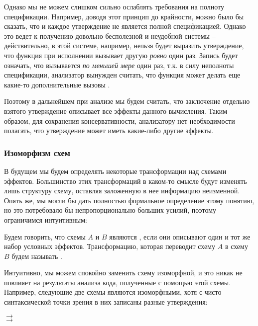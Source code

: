 Однако мы не можем слишком сильно ослаблять требования на полноту спецификации. Например, доводя этот принцип до крайности, можно было бы сказать, что и каждое утверждение не является полной спецификацией. Однако это ведет к получению довольно бесполезной и неудобной системы -- действительно, в этой системе, например, нельзя будет выразить утверждение, что функция при исполнении вызывает другую \emph{ровно} один раз. Запись  будет означать, что  вызывается \emph{по меньшей мере} один раз, т.к. в силу неполноты спецификации, анализатор вынужден считать, что функция может делать еще какие-то дополнительные вызовы .


Поэтому в дальнейшем при анализе мы будем считать, что заключение отдельно взятого утверждение описывает все эффекты данного вычисления. Таким образом, для сохранения консервативности, анализатору нет необходимости полагать, что утверждение может иметь какие-либо другие эффекты.

\subsubsection{Изоморфизм схем}

В будущем мы будем определять некоторые трансформации над схемами эффектов. Большинство этих трансформаций в каком-то смысле будут изменять лишь структуру схему, оставляя заложенную в нее информацию неизменной. Опять же, мы могли бы дать полностью формальное определение этому понятию, но это потребовало бы непропорционально больших усилий, поэтому ограничимся интуитивным:

\begin{definition}
    Будем говорить, что схемы $A$ и $B$ являются , если они описывают один и тот же набор условных эффектов. Трансформацию, которая переводит схему $A$ в схему $B$ будем называть .
\end{definition}

Интуитивно, мы можем спокойно заменить схему изоморфной, и это никак не повлияет на результаты анализа кода, полученные с помощью этой схемы. Например, следующие две схемы являются изоморфными, хотя с чисто синтаксической точки зрения в них записаны разные утверждения:

{
       $\rightarrow$  \\
     $\rightarrow$  \\
}{}


